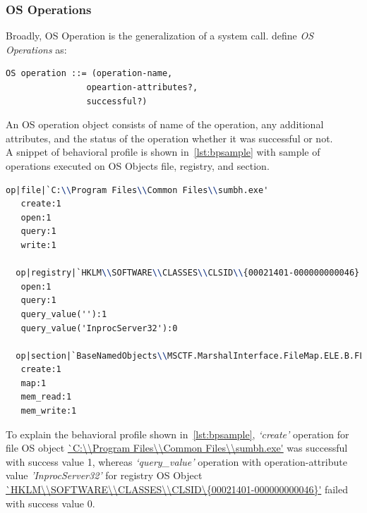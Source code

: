 \subsubsection{OS Operations}
\label{ssub:OS Operations}
Broadly, OS Operation is the generalization of a system call.
\citeauthor{bayer} define \emph{OS Operations} as:
\begin{lstlisting}
OS operation ::= (operation-name,
                opeartion-attributes?,
                successful?)
\end{lstlisting}
An OS operation object consists of name of the operation, any additional attributes, and the status of the operation whether it was successful or not.\\
A snippet of behavioral profile is shown in~\autoref{lst:bpsample} with sample of operations executed on OS Objects file, registry, and section.
\begin{lstlisting}[language=TeX,caption={Behvaioral Profile sample}, label={lst:bpsample}]
  op|file|`C:\\Program Files\\Common Files\\sumbh.exe'
   create:1
   open:1
   query:1
   write:1

  op|registry|`HKLM\\SOFTWARE\\CLASSES\\CLSID\\{00021401-000000000046}'
   open:1
   query:1
   query_value(''):1
   query_value('InprocServer32'):0

  op|section|`BaseNamedObjects\\MSCTF.MarshalInterface.FileMap.ELE.B.FLKMG'
   create:1
   map:1
   mem_read:1
   mem_write:1
\end{lstlisting}
To explain the behavioral profile shown in~\autoref{lst:bpsample}, \textit{`create'} operation for file OS object \url{`C:\\Program Files\\Common Files\\sumbh.exe'} was successful with success value 1, whereas \textit{`query\_value'} operation with operation-attribute value \emph{'InprocServer32'} for registry OS Object \url{`HKLM\\SOFTWARE\\CLASSES\\CLSID\\{00021401-000000000046}'} failed with success value 0. %
\\


